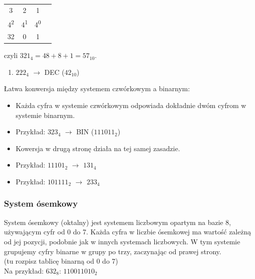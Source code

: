 \documentclass[a4paper,12pt]{article}
\begin{document}
\begin{table}[H]
\centering
\begin{tabular}{|c|c|c|c|}
\hline
3 & 2 & 1 \\
4\textsuperscript{2} & 4\textsuperscript{1} & 4\textsuperscript{0} \\
32 & 0 & 1 \\
\hline
\end{tabular}
\end{table}

czyli $321_4 = 48 + 8 + 1 = 57_{10}$.

\begin{enumerate}
    \item $222_4$ $\rightarrow$ DEC ($42_{10}$)
\end{enumerate}

Łatwa konwersja między systemem czwórkowym a binarnym:
\begin{itemize}
    \item Każda cyfra w systemie czwórkowym odpowiada dokładnie dwóm cyfrom w systemie binarnym.
    \item Przykład: $323_4$ $\rightarrow$ BIN ($111011_2$)
    \item Kowersja w drugą stronę działa na tej samej zasadzie.
    \item Przykład: $11101_2$ $\rightarrow$ $131_4$
    \item Przykład: $101111_2$ $\rightarrow$ $233_4$
\end{itemize}

\subsubsection*{System ósemkowy}
System ósemkowy (oktalny) jest systemem liczbowym opartym na bazie 8, używającym cyfr od 0 do 7. Każda cyfra w liczbie ósemkowej ma wartość zależną od jej pozycji, podobnie jak w innych systemach liczbowych.
W tym systemie grupujemy cyfry binarne w grupy po trzy, zaczynając od prawej strony. 
\\
(tu rozpisz tablicę binarną od 0 do 7)
\\
Na przykład: $632_8$: $110 011 010_2$
\end{document}
